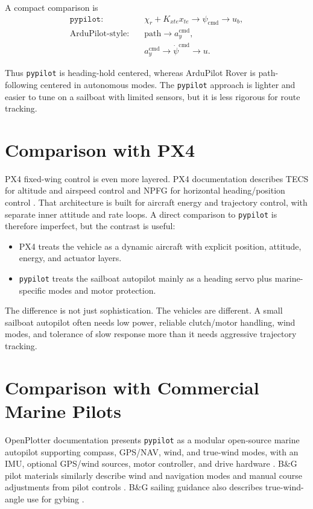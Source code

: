 \documentclass[11pt,twocolumn]{article}
\newcommand{\heading}{\psi}
\newcommand{\cmd}{\mathrm{cmd}}
\begin{document}
A compact comparison is
\begin{align}
\texttt{pypilot:}\quad
& \chi_r + K_{xte}x_{te} \to \heading_{\cmd} \to u_b, \\
\text{ArduPilot-style:}\quad
& \text{path} \to a_y^{\cmd}, \\
& a_y^{\cmd} \to \dot{\heading}^{\cmd} \to u.
\end{align}

Thus \texttt{pypilot} is heading-hold centered, whereas ArduPilot Rover is path-following
centered in autonomous modes.  The \texttt{pypilot} approach is lighter and easier to tune
on a sailboat with limited sensors, but it is less rigorous for route tracking.

\section{Comparison with PX4}

PX4 fixed-wing control is even more layered.  PX4 documentation describes TECS for
altitude and airspeed control and NPFG for horizontal heading/position control
\cite{px4-fw}.  That architecture is built for aircraft energy and trajectory control,
with separate inner attitude and rate loops.  A direct comparison to \texttt{pypilot} is
therefore imperfect, but the contrast is useful:
\begin{itemize}
\item PX4 treats the vehicle as a dynamic aircraft with explicit position, attitude,
energy, and actuator layers.
\item \texttt{pypilot} treats the sailboat autopilot mainly as a heading servo plus
marine-specific modes and motor protection.
\end{itemize}

The difference is not just sophistication.  The vehicles are different.  A small sailboat
autopilot often needs low power, reliable clutch/motor handling, wind modes, and tolerance
of slow response more than it needs aggressive trajectory tracking.

\section{Comparison with Commercial Marine Pilots}

OpenPlotter documentation presents \texttt{pypilot} as a modular open-source marine
autopilot supporting compass, GPS/NAV, wind, and true-wind modes, with an IMU, optional
GPS/wind sources, motor controller, and drive hardware \cite{openplotter-pypilot}.  B\&G
pilot materials similarly describe wind and navigation modes and manual course adjustments
from pilot controls \cite{bg-pilot}.  B\&G sailing guidance also describes true-wind-angle
use for gybing \cite{bg-setup}.
\end{document}
